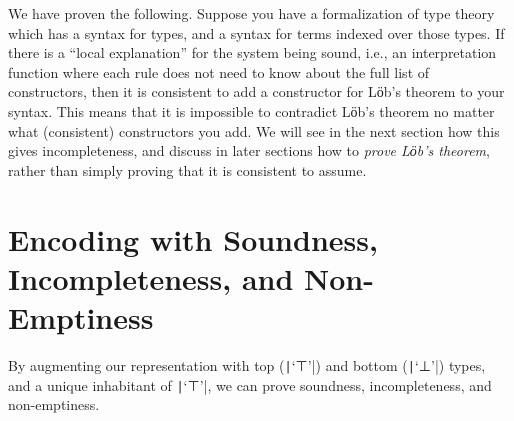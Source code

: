  We have proven the following.  Suppose you have a formalization of
 type theory which has a syntax for types, and a syntax for terms
 indexed over those types.  If there is a ``local explanation'' for
 the system being sound, i.e., an interpretation function where each
 rule does not need to know about the full list of constructors, then
 it is consistent to add a constructor for Lӧb's theorem to your
 syntax.  This means that it is impossible to contradict Lӧb's theorem
 no matter what (consistent) constructors you add.  We will see in the
 next section how this gives incompleteness, and discuss in later
 sections how to \emph{prove Lӧb's theorem}, rather than simply
 proving that it is consistent to assume.

\section{Encoding with Soundness, Incompleteness, and Non-Emptiness} \label{sec:extended-trivial}

 By augmenting our representation with top (\texttt|‘⊤’|)
 and bottom (\texttt|‘⊥’|) types, and a unique inhabitant of
 \texttt|‘⊤’|, we can prove soundness, incompleteness, and
 non-emptiness.


